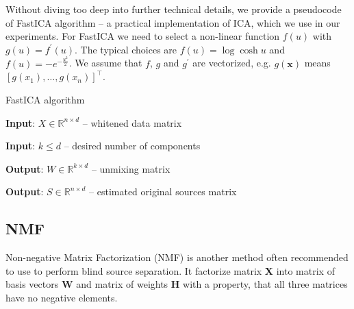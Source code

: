 \documentclass[../main.tex]{subfiles} %
\begin{document}
Without diving too deep into further technical details, we provide a pseudocode of FastICA algorithm \cite{ica,fastica} -- a practical implementation of ICA, which we use in our experiments. For FastICA we need to select a non-linear function $f(u)$ with $g(u) = f^\prime(u)$. The typical choices are $f(u) = \log\cosh u$ and $f(u) = - e^{-\frac{u^2}{2}}$. We assume that $f$, $g$ and $g^\prime$ are vectorized, e.g. $g(\mathbf{x})$ means $\left[ g(x_1), \ldots, g(x_n) \right]^\top$.

\begin{algorithm} 
	\begin{algorithmic}
		\caption{FastICA algorithm}\label{fastica}
		\item \textbf{Input}: $X \in \mathbb{R}^{n \times d}$ -- whitened data matrix
		\item \textbf{Input}: $k \le d$ -- desired number of components
		\item \textbf{Output}: $W \in \mathbb{R}^{k \times d}$ -- unmixing matrix
		\item \textbf{Output}: $S \in \mathbb{R}^{n \times d}$ -- estimated original sources matrix
		
		 
		 
		 
		\EndWhile
		\EndFor
		\EndFunction
	\end{algorithmic}
\end{algorithm}

\subsection{NMF}

Non-negative Matrix Factorization (NMF) \cite{nmf, nmf_wiki} is another method often recommended to use to perform blind source separation. It factorize matrix \textbf{X} into matrix of basis vectors \textbf{W} and matrix of weights \textbf{H} with a property, that all three matrices have no negative elements. 
\end{document}
